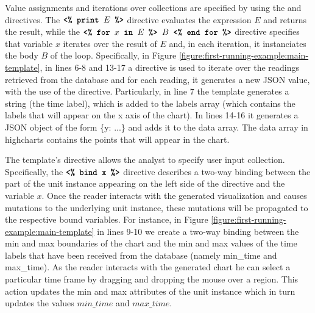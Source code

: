  Value assignments and iterations over collections are specified by using the  and  directives. The $\texttt{\textbf{<\% print }} E \texttt{\textbf{ \%>}}$ directive evaluates the expression $E$ and returns the result, while the $\texttt{\textbf{<\% for }} x \texttt{\textbf{ in }} E \texttt{\textbf{ \%> }} B \texttt{\textbf{ <\% end for \%>}}$ directive specifies that variable $x$ iterates over the result of $E$ and, in each iteration, it instanciates the body $B$ of the  loop. Specifically, in Figure \ref{figure:first-running-example:main-template}, in lines 6-8 and 13-17 a  directive is used to iterate over the readings retrieved from the database and for each reading, it generates a new JSON value, with the use of the  directive. Particularly, in line 7 the template generates a string (the time label), which is added to the labels array (which contains the labels that will appear on the x axis of the chart). In lines 14-16 it generates a JSON object of the form \{y: ...\} and adds it to the data array. The data array in highcharts contains the points that will appear in the chart.






 The template's  directive allows the analyst to specify user input collection. Specifically, the $\texttt{\textbf{<\% bind x}} \texttt{\textbf{ \%>}}$ directive describes a two-way binding between the part of the unit instance appearing on the left side of the directive and the variable $x$. Once the reader interacts with the generated visualization and causes mutations to the underlying unit instance, these mutations will be propagated to the respective bound variables. For instance, in Figure \ref{figure:first-running-example:main-template} in lines 9-10 we create a two-way binding between the min and max boundaries of the chart and the min and max values of the time labels that have been received from the database (namely min\_time and max\_time). As the reader interacts with the generated chart he can select a particular time frame by dragging and dropping the mouse over a region. This action updates the min and max attributes of the unit instance which in turn updates the values $min\_time$ and $max\_time$. 

